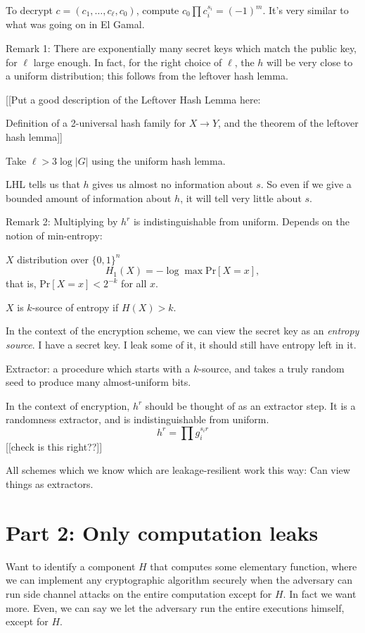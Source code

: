 \documentclass[10pt]{article}
\newcommand{\bit}{\{0,1\}}
\newcommand{\Prob}[1]{\text{Pr}\left[ {#1} \right]}
\begin{document}
To decrypt $c = (c_1, \ldots, c_\ell, c_0)$, compute $c_0 \prod c_i^{s_i} = (-1)^m$. It's very similar to what was going on in El Gamal.

Remark 1: There are exponentially many secret keys which match the public key, for $\ell$ large enough. In fact, for the right choice of $\ell$, the $h$ will be very close to a uniform distribution; this follows from the leftover hash lemma. 

[[Put a good description of the Leftover Hash Lemma here:

Definition of a 2-universal hash family for $X \to Y$, and the theorem of the leftover hash lemma]]

Take $\ell > 3 \log |G|$ using the uniform hash lemma.

LHL tells us that $h$ gives us almost no information about $s$. So even if we give a bounded amount of information about $h$, it will tell very little about $s$.

Remark 2: Multiplying by $h^r$ is indistinguishable from uniform.  Depends on the notion of min-entropy:

$X$ distribution over $\bit^n$
\[
H_1(X) = -\log \max \Prob{X = x},
\]
that is, $\Prob{X = x} < 2^{-k}$ for all $x$.

$X$ is $k$-source of entropy if $H(X) > k$.

In the context of the encryption scheme, we can view the secret key as an \emph{entropy source}. I have a secret key. I leak some of it, it should still have entropy left in it.

Extractor: a procedure which starts with a $k$-source, and takes a truly random seed to produce many almost-uniform bits.

In the context of encryption, $h^r$ should be thought of as an extractor step. It is a randomness extractor, and is indistinguishable from uniform.
\[
h^r = \prod g_i^{s_i r}
\]
[[check is this right??]]

All schemes which we know which are leakage-resilient work this way: Can view things as extractors.

\section{Part 2: Only computation leaks}

Want to identify a component $H$ that computes some elementary function, where we can implement any cryptographic algorithm securely when the adversary can run side channel attacks on the entire computation except for $H$. In fact we want more. Even, we can say we let the adversary run the entire executions himself, except for $H$.
\end{document}
